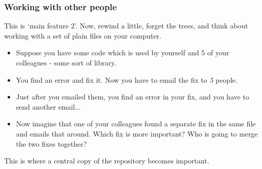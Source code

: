 \documentclass{beamer}
\begin{document}
\begin{frame}
  \frametitle{Working with other people}

    This is `main feature 2'. Now, rewind a little, forget the trees, and
    think about working with a set of plain files on your computer.


  \begin{itemize}
    \item Suppose you have some code which is used by yourself and 5 of your
      colleagues - some sort of library.

    \pause \item You find an error and fix it. Now you have to email the fix to \emph{5} people.

    \pause \item Just after you emailed them, you find an error in your fix, and you
    have to send another email...

    \pause \item Now imagine that one of your colleagues found a
    separate fix in the same file and emails that around. Which fix is
    more important? Who is going to merge the two fixes together?
  \end{itemize}

  This is where a central copy of the repository becomes important.
\end{frame}
\end{document}
